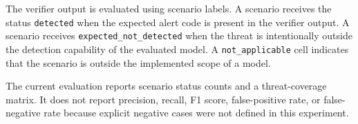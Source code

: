 The verifier output is evaluated using scenario labels. A scenario receives the status \texttt{detected} when the expected alert code is present in the verifier output. A scenario receives \texttt{expected\_not\_detected} when the threat is intentionally outside the detection capability of the evaluated model. A \texttt{not\_applicable} cell indicates that the scenario is outside the implemented scope of a model.

The current evaluation reports scenario status counts and a threat-coverage matrix. It does not report precision, recall, F1 score, false-positive rate, or false-negative rate because explicit negative cases were not defined in this experiment.
